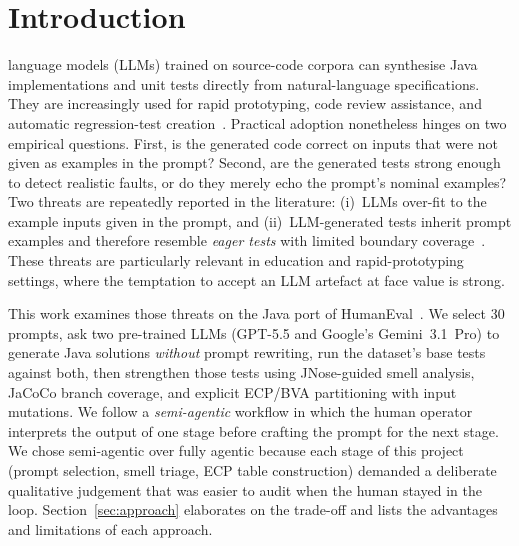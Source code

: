 \documentclass[journal]{IEEEtran}
\begin{document}
\section{Introduction}
 language models (LLMs) trained on
source-code corpora can synthesise Java implementations and
unit tests directly from natural-language specifications. They
are increasingly used for rapid prototyping, code review
assistance, and automatic regression-test
creation~\cite{liu2023evalplus,siddiq2024junit}. Practical
adoption nonetheless hinges on two empirical questions. First,
is the generated code correct on inputs that were not given as
examples in the prompt? Second, are the generated tests strong
enough to detect realistic faults, or do they merely echo the
prompt's nominal examples? Two threats are repeatedly reported
in the literature: (i)~LLMs over-fit to the example inputs
given in the prompt, and (ii)~LLM-generated tests inherit
prompt examples and therefore resemble \emph{eager tests} with
limited boundary
coverage~\cite{siddiq2024junit,grano2024testsmells}. These
threats are particularly relevant in education and
rapid-prototyping settings, where the temptation to accept an
LLM artefact at face value is strong.

This work examines those threats on the Java port of
HumanEval~\cite{liu2023evalplus}. We select 30 prompts, ask
two pre-trained LLMs (GPT-5.5 and Google's Gemini~3.1~Pro)
to generate Java solutions \emph{without}
prompt rewriting, run the dataset's base tests against both,
then strengthen those tests using JNose-guided smell analysis,
JaCoCo branch coverage, and explicit ECP/BVA partitioning with
input mutations. We follow a \emph{semi-agentic} workflow in
which the human operator interprets the output of one stage
before crafting the prompt for the next stage. We chose
semi-agentic over fully agentic because each stage of this
project (prompt selection, smell triage, ECP table
construction) demanded a deliberate qualitative judgement that
was easier to audit when the human stayed in the loop.
Section~\ref{sec:approach} elaborates on the trade-off and
lists the advantages and limitations of each approach.
\end{document}
